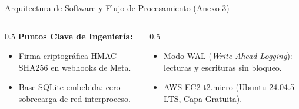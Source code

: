 \documentclass[aspectratio=169, 10pt]{beamer}
\begin{document}
\begin{frame}{Arquitectura de Software y Flujo de Procesamiento (Anexo 3)}
\begin{center}
  \end{center}
  
  \vspace{-0.1cm}
  \begin{columns}
    \begin{column}{0.5\textwidth}
      \textbf{Puntos Clave de Ingeniería:}
      \begin{itemize}\footnotesize\setlength{\itemsep}{1pt}
        \item Firma criptográfica HMAC-SHA256 en webhooks de Meta.
        \item Base SQLite embebida: cero sobrecarga de red interproceso.
      \end{itemize}
    \end{column}
    \begin{column}{0.5\textwidth}
      \begin{itemize}\footnotesize\setlength{\itemsep}{1pt}
        \item Modo WAL (\textit{Write-Ahead Logging}): lecturas y escrituras sin bloqueo.
        \item AWS EC2 t2.micro (Ubuntu 24.04.5 LTS, Capa Gratuita).
      \end{itemize}
    \end{column}
  \end{columns}
\end{frame}
\end{document}
